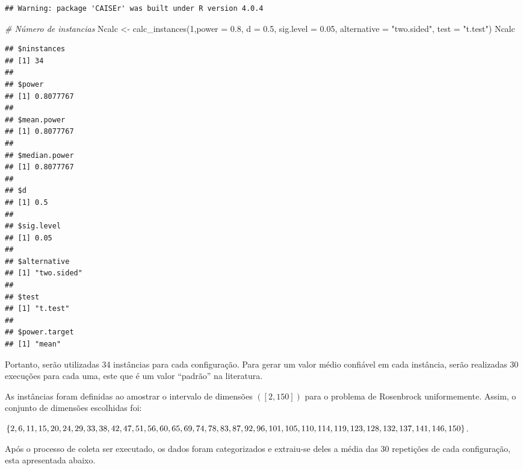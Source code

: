 \documentclass[
]{article}
\newenvironment{Shaded}{\begin{snugshade}}{\end{snugshade}}
\newcommand{\AttributeTok}[1]{\textcolor[rgb]{0.77,0.63,0.00}{#1}}
\newcommand{\CommentTok}[1]{\textcolor[rgb]{0.56,0.35,0.01}{\textit{#1}}}
\newcommand{\DecValTok}[1]{\textcolor[rgb]{0.00,0.00,0.81}{#1}}
\newcommand{\FloatTok}[1]{\textcolor[rgb]{0.00,0.00,0.81}{#1}}
\newcommand{\FunctionTok}[1]{\textcolor[rgb]{0.00,0.00,0.00}{#1}}
\newcommand{\NormalTok}[1]{#1}
\newcommand{\OtherTok}[1]{\textcolor[rgb]{0.56,0.35,0.01}{#1}}
\newcommand{\StringTok}[1]{\textcolor[rgb]{0.31,0.60,0.02}{#1}}
\begin{document}
\begin{verbatim}
## Warning: package 'CAISEr' was built under R version 4.0.4
\end{verbatim}

\begin{Shaded}
\begin{Highlighting}[]
\CommentTok{\# Número de instancias}
\NormalTok{Ncalc }\OtherTok{\textless{}{-}} \FunctionTok{calc\_instances}\NormalTok{(}\DecValTok{1}\NormalTok{,}\AttributeTok{power =} \FloatTok{0.8}\NormalTok{, }\AttributeTok{d =} \FloatTok{0.5}\NormalTok{, }\AttributeTok{sig.level =} \FloatTok{0.05}\NormalTok{, }\AttributeTok{alternative =} \StringTok{"two.sided"}\NormalTok{, }\AttributeTok{test =} \StringTok{"t.test"}\NormalTok{)}
\NormalTok{Ncalc}
\end{Highlighting}
\end{Shaded}

\begin{verbatim}
## $ninstances
## [1] 34
## 
## $power
## [1] 0.8077767
## 
## $mean.power
## [1] 0.8077767
## 
## $median.power
## [1] 0.8077767
## 
## $d
## [1] 0.5
## 
## $sig.level
## [1] 0.05
## 
## $alternative
## [1] "two.sided"
## 
## $test
## [1] "t.test"
## 
## $power.target
## [1] "mean"
\end{verbatim}

Portanto, serão utilizadas 34 instâncias para cada configuração. Para
gerar um valor médio confiável em cada instância, serão realizadas 30
execuções para cada uma, este que é um valor ``padrão'' na literatura.

As instâncias foram definidas ao amostrar o intervalo de dimensões
\(([2,150])\) para o problema de Rosenbrock uniformemente. Assim, o
conjunto de dimensões escolhidas foi:

\(\{2,6,11,15,20,24,29,33,38,42,47,51,56,60,65,69,74,78,83,87,\\ 92,96,101,105,110,114,119,123,128,132,137,141,146,150\}\).

Após o processo de coleta ser executado, os dados foram categorizados e
extraiu-se deles a média das 30 repetições de cada configuração, esta
apresentada abaixo.
\end{document}
